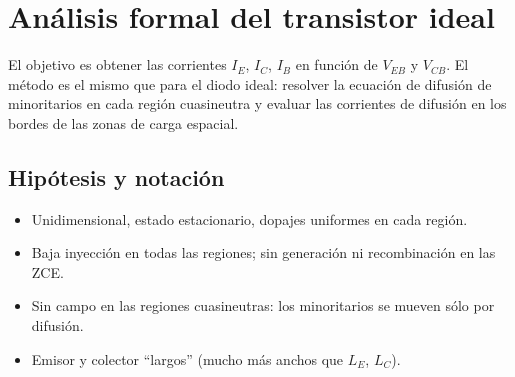 \section{Análisis formal del transistor ideal}
\label{sec:formal}

El objetivo es obtener las corrientes $I_E$, $I_C$, $I_B$ en función de $V_{EB}$ y $V_{CB}$.
El método es el mismo que para el diodo ideal: resolver la ecuación de difusión de
minoritarios en cada región cuasineutra y evaluar las corrientes de difusión en los bordes
de las zonas de carga espacial.

\subsection{Hipótesis y notación}

\begin{itemize}
  \item Unidimensional, estado estacionario, dopajes uniformes en cada región.
  \item Baja inyección en todas las regiones; sin generación ni recombinación en las ZCE.
  \item Sin campo en las regiones cuasineutras: los minoritarios se mueven sólo por difusión.
  \item Emisor y colector ``largos'' (mucho más anchos que $L_E$, $L_C$).
\end{itemize}

